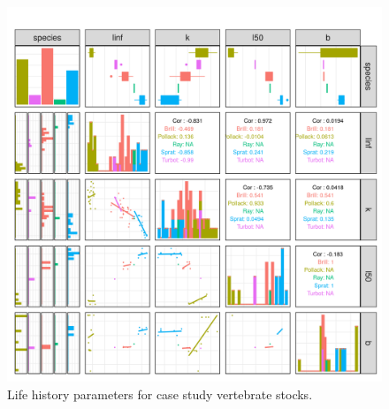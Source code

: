 \begin{figure}[h!]\centering\includegraphics[width=6in]{figs/1-pairwise-1.png}\caption{Life history parameters for case study vertebrate stocks.}\label{fig:stocks}
\end{figure}

